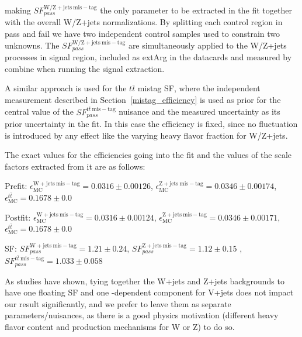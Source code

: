 making $SF^{\mathrm{W/Z+jets~mis-tag}}_{pass}$ the only parameter to be extracted in the fit together with the overall W/Z+jets normalizations. By splitting each control region in pass and fail we have two independent control samples used to constrain two unknowns. The $SF^{\mathrm{W/Z+jets~mis-tag}}_{pass}$ are simultaneously applied to the W/Z+jets processes in signal region, included as extArg in the datacards and measured by combine when running the signal extraction. 

A similar approach is used for the $t\bar{t}$ mistag SF, where the independent measurement described in Section~\ref{mistag_efficiency} is used as prior for the central value of the $SF^{t\bar{t}\mathrm{~mis-tag}}_{pass}$ nuisance and the measured uncertainty as its prior uncertainty in the fit. In this case the efficiency is fixed, since no fluctuation is introduced by any effect like the varying heavy flavor fraction for W/Z+jets.

The exact values for the efficiencies going into the fit and the values of the scale factors extracted from it are as follows: 

Prefit: $\epsilon^{\mathrm{W+jets~mis-tag}}_{\mathrm{MC}}=0.0316\pm 0.00126$, $\epsilon^{\mathrm{Z+jets~mis-tag}}_{\mathrm{MC}}=0.0346\pm 0.00174$, $\epsilon^{t\bar{t}}_{\mathrm{MC}}=0.1678\pm 0.0$

Postfit: $\epsilon^{\mathrm{W+jets~mis-tag}}_{\mathrm{MC}}=0.0316\pm 0.00124$, $\epsilon^{\mathrm{Z+jets~mis-tag}}_{\mathrm{MC}}=0.0346\pm 0.00171$, $\epsilon^{t\bar{t}}_{\mathrm{MC}}=0.1678\pm 0.0$

SF: $SF^{\mathrm{W+jets~mis-tag}}_{pass}=1.21\pm0.24$, $SF^{\mathrm{Z+jets~mis-tag}}_{pass}=1.12\pm0.15$ ,$SF^{t\bar{t}~\mathrm{mis-tag}}_{pass}=1.033\pm0.058$



As studies have shown, tying together the W+jets and Z+jets backgrounds to have one floating SF and one \pt-dependent component for V+jets does not impact our result significantly, and we prefer to leave them as separate parameters/nuisances, as there is a good physics motivation (different heavy flavor content and production mechanisms for W or Z) to do so.


